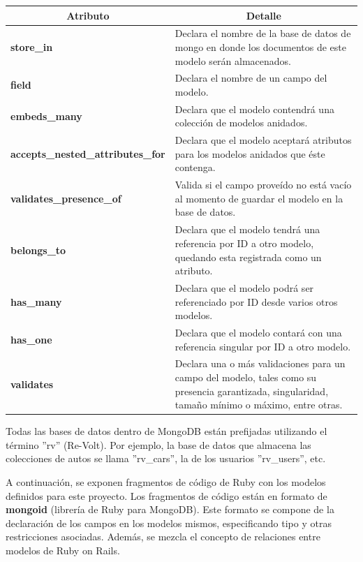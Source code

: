 \begin{center}
  \begin{tabular}{ | p{6cm} | p{9cm} |}
    \hline
    \multicolumn{1}{|c|}{\textbf{Atributo}} & \multicolumn{1}{|c|}{\textbf{Detalle}} \\
    \hline
    
    {\textbf{store\_in}} & Declara el nombre de la base de datos de mongo en donde los documentos de este modelo serán almacenados.\\ \hline
    {\textbf{field}} & Declara el nombre de un campo del modelo. \\ \hline
    {\textbf{embeds\_many}} & Declara que el modelo contendrá una colección de modelos anidados. \\ \hline
    {\textbf{accepts\_nested\_attributes\_for}} & Declara que el modelo aceptará atributos para los modelos anidados que éste contenga. \\ \hline
    {\textbf{validates\_presence\_of}} & Valida si el campo proveído no está vacío al momento de guardar el modelo en la base de datos. \\ \hline
    {\textbf{belongs\_to}} & Declara que el modelo tendrá una referencia por ID a otro modelo, quedando esta registrada como un atributo.
    \\ \hline
    {\textbf{has\_many}} & Declara que el modelo podrá ser referenciado por ID desde varios otros modelos. \\ \hline
    {\textbf{has\_one}} & Declara que el modelo contará con una referencia singular por ID a otro modelo. \\ \hline
    {\textbf{validates}} & Declara una o más validaciones para un campo del modelo, tales como su presencia garantizada, singularidad, tamaño mínimo o máximo, entre otras.\\ \hline
  \end{tabular}
  
  \label{table:schema}
\end{center}

Todas las bases de datos dentro de MongoDB están prefijadas utilizando el término ''rv'' (Re-Volt). Por ejemplo, la base de datos que almacena las colecciones de autos se llama ''rv\_cars'', la de los usuarios ''rv\_users'', etc.

A continuación, se exponen fragmentos de código de Ruby con los modelos definidos para este proyecto. Los fragmentos de código están en formato de \textbf{mongoid} (librería de Ruby para MongoDB). Este formato se compone de la declaración de los campos en los modelos mismos, especificando tipo y otras restricciones asociadas. Además, se mezcla el concepto de relaciones entre modelos de Ruby on Rails.

